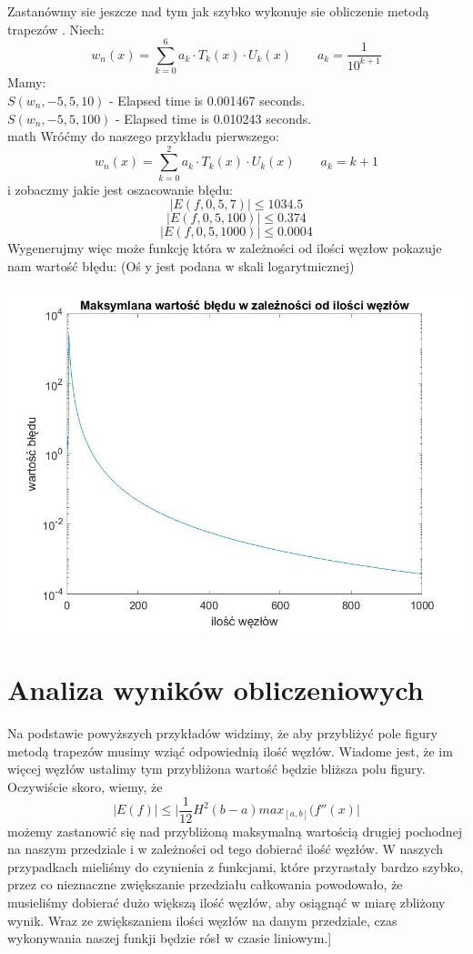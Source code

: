 \documentclass{article}\usepackage{amsmath,amsfonts,amssymb}
\begin{document}
Zastanówmy sie jeszcze nad tym jak szybko wykonuje sie obliczenie metodą trapezów . Niech:
\[ w_{n}(x) = \sum_{k = 0}^{6} a_{k}  \cdot T_{k}(x)  \cdot U_{k}(x) \quad \quad a_{k} = \frac{1}{10^{k+1}}\] 
Mamy:\\
\boldmath
$S(w_{n}, -5, 5, 10) $  -   Elapsed time is 0.001467 seconds.\\
$ S(w_{n}, -5, 5, 100) $  - Elapsed time is 0.010243 seconds.\\
\unbold math
Wróćmy do naszego przykładu pierwszego:
\[ w_{n}(x) = \sum_{k = 0}^{2} a_{k}  \cdot T_{k}(x)  \cdot U_{k}(x) \quad \quad a_{k} = k +1 \] 
i zobaczmy jakie jest oszacowanie błędu:
\[ \lvert E(f,0,5,7) \rvert \leq 1034.5 \]
\[ \lvert E(f,0,5,100) \rvert \leq 0.374   \] 
\[ \lvert E(f,0,5,1000) \rvert \leq  0.0004\] 
Wygenerujmy więc może funkcję która w zależności od ilości węzłow pokazuje nam wartość błędu: (Oś y jest podana w skali logarytmicznej)
\begin{center}
   \includegraphics[scale=0.3]{maksymalnebledy.jpg}
\end{center}



\section{Analiza wyników obliczeniowych}
Na podstawie powyższych przykładów widzimy, że aby przybliżyć pole figury metodą trapezów musimy wziąć odpowiednią ilość węzłów.
Wiadome jest, że im więcej węzłów ustalimy tym przybliżona wartość będzie bliższa polu figury.
Oczywiście skoro, wiemy, że \[ \lvert E(f) \rvert \leq \lvert\frac{1}{12}H^2(b-a)max_{[a,b]}(f''(x) \rvert \] możemy  zastanowić się nad przybliżoną maksymalną wartością drugiej pochodnej na naszym przedziale i w zależności od tego dobierać ilość węzłów. W naszych przypadkach mieliśmy do czynienia z funkcjami, które przyrastały bardzo szybko, przez co nieznaczne zwiększanie przedziału całkowania powodowało, że musieliśmy dobierać dużo większą ilość węzłów, aby osiągnąć w miarę zbliżony wynik. Wraz ze zwiększaniem ilości węzłów na danym przedziale, czas wykonywania naszej funkji będzie rósł w czasie liniowym.]
\end{document}
